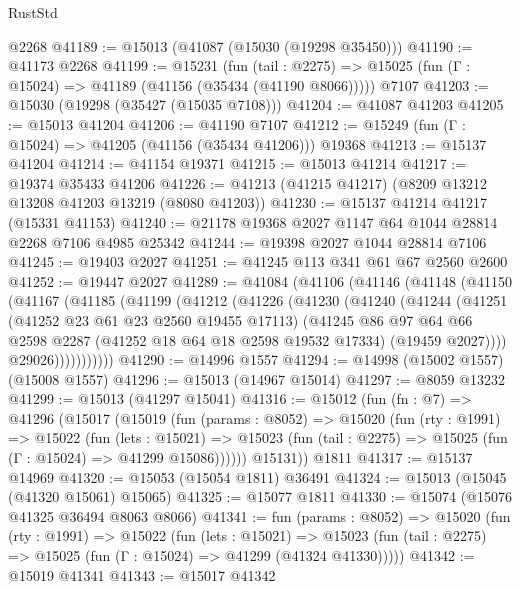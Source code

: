\begin{lexlean}{RustStd}
\begin{coremodule}
    @2268
@41189 := @15013 (@41087 (@15030 (@19298 @35450)))
@41190 := @41173 @2268
@41199 := @15231
    (fun (tail : @2275) => @15025 (fun (Γ : @15024) => @41189 (@41156 (@35434 (@41190 @8066)))))
    @7107
@41203 := @15030 (@19298 (@35427 (@15035 @7108)))
@41204 := @41087 @41203
@41205 := @15013 @41204
@41206 := @41190 @7107
@41212 := @15249 (fun (Γ : @15024) => @41205 (@41156 (@35434 @41206))) @19368
@41213 := @15137 @41204
@41214 := @41154 @19371
@41215 := @15013 @41214
@41217 := @19374 @35433 @41206
@41226 := @41213 (@41215 @41217) (@8209 @13212 @13208 @41203 @13219 (@8080 @41203))
@41230 := @15137 @41214 @41217 (@15331 @41153)
@41240 := @21178 @19368 @2027 @1147 @64 @1044 @28814 @2268 @7106 @4985 @25342
@41244 := @19398 @2027 @1044 @28814 @7106
@41245 := @19403 @2027
@41251 := @41245 @113 @341 @61 @67 @2560 @2600
@41252 := @19447 @2027
@41289 := @41084
    (@41106
      (@41146
        (@41148
          (@41150
            (@41167
              (@41185
                (@41199
                  (@41212
                    (@41226
                      (@41230
                        (@41240
                          (@41244
                            (@41251
                              (@41252 @23 @61 @23 @2560 @19455 @17113)
                              (@41245
                                @86
                                @97
                                @64
                                @66
                                @2598
                                @2287
                                (@41252 @18 @64 @18 @2598 @19532 @17334)
                                (@19459 @2027))))
                          @29026)))))))))))
@41290 := @14996 @1557
@41294 := @14998 (@15002 @1557) (@15008 @1557)
@41296 := @15013 (@14967 @15014)
@41297 := @8059 @13232
@41299 := @15013 (@41297 @15041)
@41316 := @15012
    (fun (fn : @7) =>
    @41296
      (@15017
        (@15019
          (fun (params : @8052) =>
          @15020
            (fun (rty : @1991) =>
            @15022
              (fun (lets : @15021) =>
              @15023 (fun (tail : @2275) => @15025 (fun (Γ : @15024) => @41299 @15086))))))
        @15131))
    @1811
@41317 := @15137 @14969
@41320 := @15053 (@15054 @1811) @36491
@41324 := @15013 (@15045 (@41320 @15061) @15065)
@41325 := @15077 @1811
@41330 := @15074 (@15076 @41325 @36494 @8063 @8066)
@41341 := fun (params : @8052) =>
  @15020
    (fun (rty : @1991) =>
    @15022
      (fun (lets : @15021) =>
      @15023 (fun (tail : @2275) => @15025 (fun (Γ : @15024) => @41299 (@41324 @41330)))))
@41342 := @15019 @41341
@41343 := @15017 @41342

\end{coremodule}
\end{lexlean}
